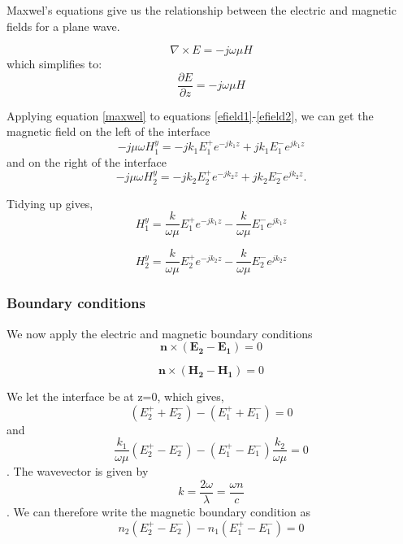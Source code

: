 \documentclass[11pt]{article}
\begin{document}
Maxwel's equations give us the relationship between the electric and magnetic fields for a plane wave.

\begin{equation}
\nabla \times E=-j\omega \mu H 
\end{equation}
which simplifies to:
\begin{equation}
\frac{\partial E} {\partial z}=-j\omega \mu H 
\label{maxwel}
\end{equation}

Applying equation \ref{maxwel} to equations \ref{efield1}-\ref{efield2}, we can get the magnetic field on the left of the interface
\begin{equation}
-j \mu \omega H^{y}_{1}=-j k_1 E^{+}_{1} e^{-j k_1 z}+j k_1 E^{-}_{1} e^{j k_1 z}
\end{equation}
and on the right of the interface
\begin{equation}
-j \mu \omega H^{y}_{2}=-j k_2 E^{+}_{2} e^{-j k_2 z}+j k_2 E^{-}_{2} e^{j k_2 z}.
\end{equation}

Tidying up gives,
\begin{equation}
H^{y}_{1}=\frac{k}{\omega \mu}E^{+}_{1} e^{-j k_1 z}-\frac{k}{\omega \mu} E^{-}_{1} e^{j k_1 z}
\end{equation}

\begin{equation}
H^{y}_{2}=\frac{k}{\omega \mu}E^{+}_{2} e^{-j k_2 z}-\frac{k}{\omega \mu} E^{-}_{2} e^{j k_2 z}
\end{equation}

\subsubsection{Boundary conditions}
We now apply the electric and magnetic boundary conditions\cite{0953-8984-25-21-215301}
\begin{equation}
\mathbf{n} \times (\mathbf{E_2}-\mathbf{E_1})=0
\end{equation}

\begin{equation}
\mathbf{n} \times (\mathbf{H_2}-\mathbf{H_1})=0
\end{equation}

We let the interface be at z=0, which gives,
\begin{equation}
(E_{2}^{+}+E_{2}^{-})-(E_{1}^{+}+E_{1}^{-})=0
\label{electric_boundary}
\end{equation}
and
\begin{equation}
\frac{k_1}{\omega \mu}(E_{2}^{+}-E_{2}^{-})-(E_{1}^{+}-E_{1}^{-})\frac{k_2}{\omega \mu}=0
\end{equation}
.
The wavevector is given by
\begin{equation}
k=\frac{2 \omega }{\lambda}=\frac{\omega n}{c}
\end{equation}
.
We can therefore write the magnetic boundary condition as
\begin{equation}
n_2 (E_{2}^{+}-E_{2}^{-}) - n_1 (E_{1}^{+}-E_{1}^{-})=0
\label{mag_boundary}
\end{equation}
\end{document}

